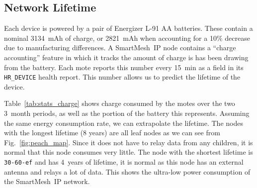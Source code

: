 \documentclass{elsarticle}
\newcommand{\smip}                {SmartMesh~IP\xspace}
\newcommand{\HRDEVICE}            {{\tt HR\_DEVICE}\xspace}
\begin{document}
\subsection{Network Lifetime}
\label{sec:lifetime}


Each device is powered by a pair of Energizer L-91 AA batteries.
These contain a nominal 3134~mAh of charge, or 2821~mAh when accounting for a 10\% decrease due to manufacturing differences.
A \smip node contains a ``charge accounting'' feature in which it tracks the amount of charge is has been drawing from the battery.
Each mote reports this number every 15~min as a field in its \HRDEVICE health report.
This number allows us to predict the lifetime of the device.


Table~\ref{tab:stats_charge} shows charge consumed by the motes over the two 3~month periods, as well as the portion of the battery this represents.
Assuming the same energy consumption rate, we can extrapolate the lifetime.
The nodes with the longest lifetime (8 years) are all leaf nodes as we can see from Fig.~\ref{fig:peach_map}.
Since it does not have to relay data from any children, it is normal that this node consumes very little.
The node with the shortest lifetime is {\tt 30-60-ef} and has 4~years of lifetime, it is normal as this node has an external antenna and relays a lot of data.
This shows the ultra-low power consumption of the \smip network.
\end{document}
